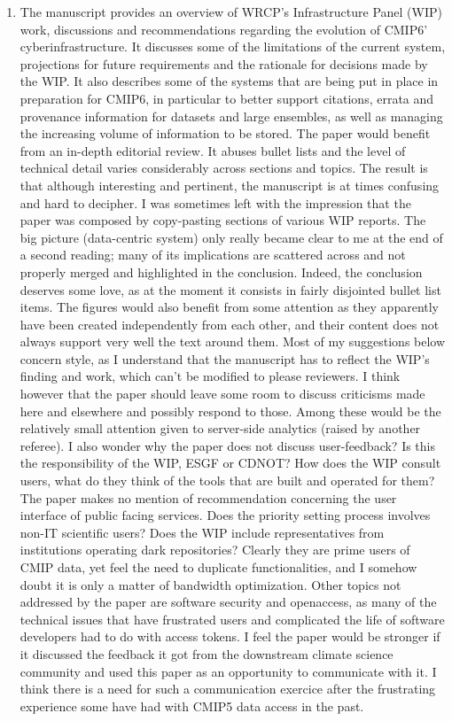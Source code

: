 \documentclass[gmd,manuscript]{copernicus}
\begin{document}
\begin{enumerate}[label=RC2-\arabic*,leftmargin=*]
\item The manuscript provides an overview of WRCP’s Infrastructure
  Panel (WIP) work, discussions and recommendations regarding the
  evolution of CMIP6’ cyberinfrastructure. It discusses some of the
  limitations of the current system, projections for future
  requirements and the rationale for decisions made by the WIP. It
  also describes some of the systems that are being put in place in
  preparation for CMIP6, in particular to better support citations,
  errata and provenance information for datasets and large ensembles,
  as well as managing the increasing volume of information to be
  stored. The paper would benefit from an in-depth editorial review.
  It abuses bullet lists and the level of technical detail varies
  considerably across sections and topics. The result is that although
  interesting and pertinent, the manuscript is at times confusing and
  hard to decipher. I was sometimes left with the impression that the
  paper was composed by copy-pasting sections of various WIP reports.
  The big picture (data-centric system) only really became clear to me
  at the end of a second reading; many of its implications are
  scattered across and not properly merged and highlighted in the
  conclusion. Indeed, the conclusion deserves some love, as at the
  moment it consists in fairly disjointed bullet list items. The
  figures would also benefit from some attention as they apparently
  have been created independently from each other, and their content
  does not always support very well the text around them. Most of my
  suggestions below concern style, as I understand that the manuscript
  has to reflect the WIP’s finding and work, which can’t be modified
  to please reviewers. I think however that the paper should leave
  some room to discuss criticisms made here and elsewhere and possibly
  respond to those. Among these would be the relatively small
  attention given to server-side analytics (raised by another
  referee). I also wonder why the paper does not discuss
  user-feedback? Is this the responsibility of the WIP, ESGF or CDNOT?
  How does the WIP consult users, what do they think of the tools that
  are built and operated for them? The paper makes no mention of
  recommendation concerning the user interface of public facing
  services. Does the priority setting process involves non-IT
  scientific users? Does the WIP include representatives from
  institutions operating dark repositories? Clearly they are prime
  users of CMIP data, yet feel the need to duplicate functionalities,
  and I somehow doubt it is only a matter of bandwidth optimization.
  Other topics not addressed by the paper are software security and
  openaccess, as many of the technical issues that have frustrated
  users and complicated the life of software developers had to do with
  access tokens. I feel the paper would be stronger if it discussed
  the feedback it got from the downstream climate science community
  and used this paper as an opportunity to communicate with it. I
  think there is a need for such a communication exercice after the
  frustrating experience some have had with CMIP5 data access in the
  past.


\end{enumerate}
\end{document}
